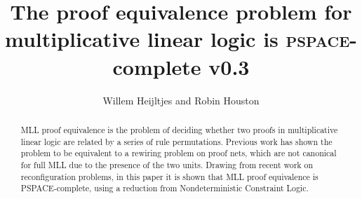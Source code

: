 \documentclass{robinminion}
\author{Willem Heijltjes and Robin Houston}
\title{The proof equivalence problem for multiplicative linear logic is \textsc{pspace}-complete v0.3}
\begin{document}
\maketitle

\begin{abstract}
MLL proof equivalence is the problem of deciding whether two proofs in multiplicative linear logic are related by a series of rule permutations.
%
Previous work has shown the problem to be equivalent to a rewiring problem on proof nets, which are not canonical for full MLL due to the presence of the two units.
%
Drawing from recent work on reconfiguration problems, in this paper it is shown that MLL proof equivalence is PSPACE-complete, using a reduction from Nondeterministic Constraint Logic.
\end{abstract}



%



 
%





\end{document}
